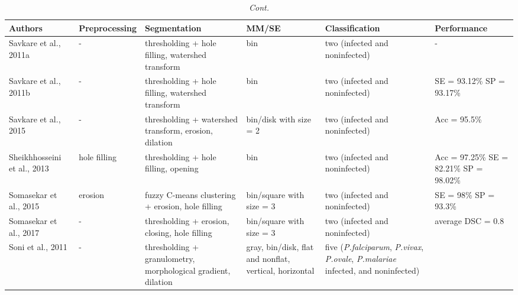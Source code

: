 \documentclass[sensors,review,accept,moreauthors,pdftex,10pt,a4paper]{mdpi}
\begin{document}
\begin{table}[H]\ContinuedFloat
\centering
\tablesize{\footnotesize} 
\caption{{\em Cont.}} \label{xx}
\begin{tabular}{m{3cm}<{\centering}m{3cm}<{\centering}m{5cm}<{\centering}m{3cm}<{\centering}m{5cm}<{\centering}m{2cm}<{\centering}}
		\toprule
    	\textbf{Authors} & \textbf{Preprocessing} & \textbf{Segmentation} & \textbf{MM/SE} & \textbf{Classification} & \textbf{Performance}\\  \midrule	

    Savkare et al., 2011a  &
    	- &
    	thresholding + hole filling, watershed transform  &
    	bin &
    	two (infected and noninfected) &
    	-
    \\
    \midrule
    Savkare et al., 2011b  &
    	- &
    	thresholding + hole filling, watershed transform  &
    	bin &
    	two (infected and noninfected) &
    	SE = 93.12\% SP = 93.17\%
    \\
    \midrule
    Savkare et al., 2015  &
    	- &
    	thresholding + watershed transform, erosion, dilation  &
    	bin/disk with size = 2 &
    	two (infected and noninfected) &
    	Acc = 95.5\%
    \\
    \midrule
    Sheikhhosseini et al., 2013  &
    	hole filling &
    	thresholding + hole filling, opening  &
    	bin &
    	two (infected and noninfected) &
    	Acc = 97.25\% SE = 82.21\% SP = 98.02\%
    \\
    \midrule
    Somasekar et al., 2015  &
    	erosion &
    	fuzzy C-means clustering + erosion, hole filling  &
    	bin/square with size = 3 &
    	two (infected and noninfected) &
    	SE = 98\% SP = 93.3\%
    \\
    \midrule
    Somasekar et al., 2017  &
    	- &
    	thresholding + erosion, closing, hole filling  &
    	bin/square with size = 3 &
    	two (infected and noninfected) &
    	average DSC = 0.8
    \\
    \midrule
    Soni et al., 2011  &
    	- &
    	thresholding + granulometry, morphological gradient, dilation  &
    	gray, bin/disk, flat and nonflat, vertical, horizontal &
    	five (\emph{P.falciparum}, \emph{P.vivax}, \emph{P.ovale}, \emph{P.malariae} infected, and noninfected) &

\end{tabular}
\end{table}
\end{document}
